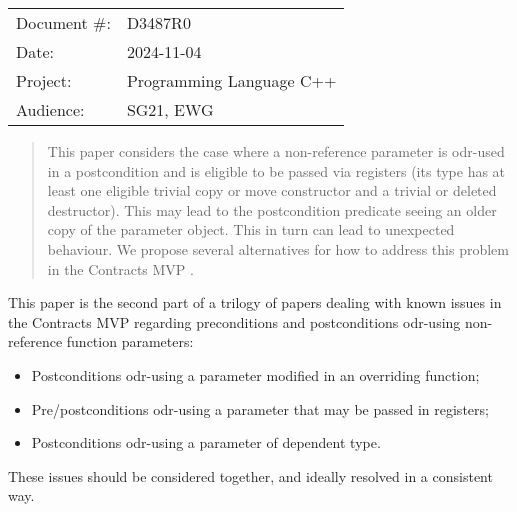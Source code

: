 \begin{tabular}{ll}
Document \#: & D3487R0 \\
Date: &2024-11-04 \\
Project: & Programming Language C++ \\
Audience: & SG21, EWG
\end{tabular}

\begin{abstract}
This paper considers the case where a non-reference parameter is odr-used in a postcondition and is eligible to be passed via registers (its type has at least one eligible trivial copy or move constructor and a trivial or deleted destructor). This may lead to the postcondition predicate seeing an older copy of the parameter object. This in turn can lead to unexpected behaviour. We propose several alternatives for how to address this problem in the Contracts MVP \cite{P2900R10}.
\end{abstract}







This paper is the second part of a trilogy of papers dealing with known issues in the Contracts MVP \cite{P2900R10} regarding preconditions and postconditions odr-using non-reference function parameters:
\begin{itemize}
\item \cite{D3484R1} Postconditions odr-using a parameter modified in an overriding function;
\item \cite{D3487R0} Pre/postconditions odr-using a parameter that may be passed in registers;
\item \cite{D3489R0} Postconditions odr-using a parameter of dependent type.
\end{itemize}
These issues should be considered together, and ideally resolved in a consistent way.


